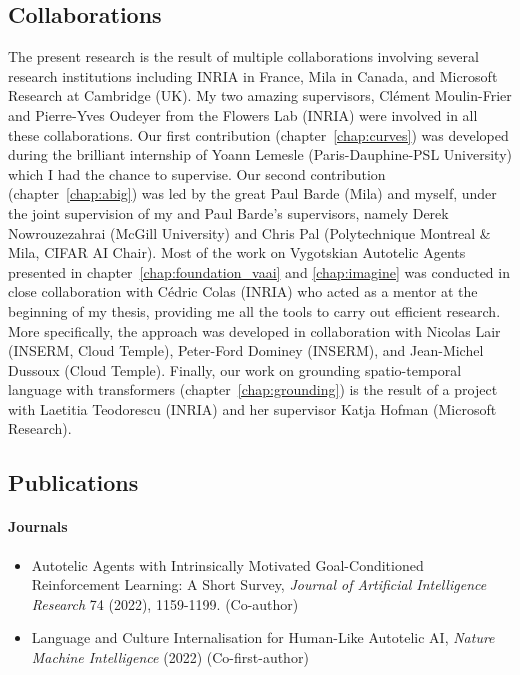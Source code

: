 \subsection{Collaborations}

The present research is the result of multiple collaborations involving several research institutions including INRIA in France, Mila in Canada, and Microsoft Research at Cambridge (UK). My two amazing supervisors, Clément Moulin-Frier and Pierre-Yves Oudeyer from the Flowers Lab (INRIA) were involved in all these collaborations. Our first contribution (chapter~\ref{chap:curves}) was developed during the brilliant internship of Yoann Lemesle (Paris-Dauphine-PSL University) which I had the chance to supervise. Our second contribution (chapter~\ref{chap:abig}) was led by the great Paul Barde (Mila) and myself, under the joint supervision of my and Paul Barde's supervisors, namely Derek Nowrouzezahrai (McGill University) and Chris Pal (Polytechnique Montreal \& Mila, CIFAR AI Chair). Most of the work on Vygotskian Autotelic Agents presented in chapter~\ref{chap:foundation_vaai} and \ref{chap:imagine} was conducted in close collaboration with C\'edric Colas (INRIA) who acted as a mentor at the beginning of my thesis, providing me all the tools to carry out efficient research. More specifically, the \imagine approach was developed in collaboration with Nicolas Lair (INSERM, Cloud Temple), Peter-Ford Dominey (INSERM), and Jean-Michel Dussoux (Cloud Temple). Finally, our work on grounding spatio-temporal language with transformers (chapter~\ref{chap:grounding}) is the result of a project with Laetitia Teodorescu (INRIA) and her supervisor Katja Hofman (Microsoft Research).  

\newpage

\subsection{Publications}

\paragraph{Journals}
\begin{itemize}
\item Autotelic Agents with Intrinsically Motivated Goal-Conditioned Reinforcement Learning: A Short Survey, \textit{Journal of Artificial Intelligence Research} 74 (2022), 1159-1199. \cite{colas2021intrinsically} (Co-author)
\item Language and Culture Internalisation for Human-Like Autotelic AI, \textit{Nature Machine Intelligence} (2022) \cite{colas2022language} (Co-first-author)
\end{itemize}

